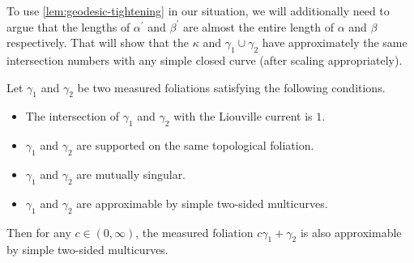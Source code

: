 \documentclass[12pt, reqno]{amsart}
\begin{document}
To use \autoref{lem:geodesic-tightening} in our situation, we will additionally need to argue that the lengths of $\alpha^{\prime}$ and $\beta^{\prime}$ are almost the entire length of $\alpha$ and $\beta$ respectively.
That will show that the $\kappa$ and $\gamma_1 \cup \gamma_2$ have approximately the same intersection numbers with any simple closed curve (after scaling appropriately).

\begin{lemma}
  \label{lem:convex-combinations}
  Let $\gamma_1$ and $\gamma_2$ be two measured foliations satisfying the following conditions.
  \begin{itemize}
  \item The intersection of $\gamma_1$ and $\gamma_2$ with the Liouville current is $1$.
  \item $\gamma_1$ and $\gamma_2$ are supported on the same topological foliation.
  \item $\gamma_1$ and $\gamma_2$ are mutually singular.
  \item $\gamma_1$ and $\gamma_2$ are approximable by simple two-sided multicurves.
  \end{itemize}
  Then for any $c \in (0, \infty)$, the measured foliation $c \gamma_1 + \gamma_2$ is also approximable by simple two-sided multicurves.
\end{lemma}
\end{document}
